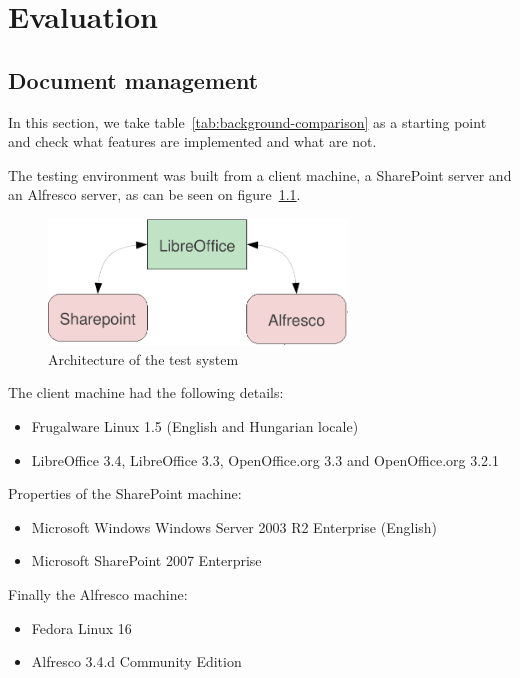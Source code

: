 \chapter{Evaluation}

\section{Document management}

In this section, we take table~\ref{tab:background-comparison} as a starting
point and check what features are implemented and what are not.

The testing environment was built from a client machine, a SharePoint server
and an Alfresco server, as can be seen on figure~\ref{fig:test-arch}.

\begin{figure}[H]
\centering
\includegraphics[width=300px,keepaspectratio]{test-arch.pdf}
\caption{Architecture of the test system}
\label{fig:test-arch}
\end{figure}

The client machine had the following details:
\begin{itemize}
\item Frugalware Linux 1.5 (English and Hungarian locale)
\item LibreOffice 3.4, LibreOffice 3.3, OpenOffice.org 3.3 and OpenOffice.org 3.2.1
\end{itemize}

Properties of the SharePoint machine:

\begin{itemize}
\item Microsoft Windows Windows Server 2003 R2 Enterprise (English)
\item Microsoft SharePoint 2007 Enterprise
\end{itemize}

Finally the Alfresco machine:

\begin{itemize}
\item Fedora Linux 16
\item Alfresco 3.4.d Community Edition
\end{itemize}

